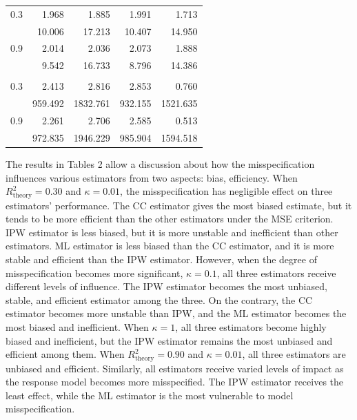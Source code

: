 \documentclass[
  12pt,
]{article}
\begin{document}
\begin{table}[H]
\begin{tabular}[t]{rrrrr}
\hspace{1em}0.3 & 1.968 & 1.885 & 1.991 & 1.713\\
\hspace{1em} & 10.006 & 17.213 & 10.407 & 14.950\\
\hspace{1em}0.9 & 2.014 & 2.036 & 2.073 & 1.888\\
\hspace{1em} & 9.542 & 16.733 & 8.796 & 14.386\\
\addlinespace[0.3em]
\multicolumn{5}{l}{\textbf{Misspecified, $\kappa$ = 1}}\\
\hspace{1em}0.3 & 2.413 & 2.816 & 2.853 & 0.760\\
\hspace{1em} & 959.492 & 1832.761 & 932.155 & 1521.635\\
\hspace{1em}0.9 & 2.261 & 2.706 & 2.585 & 0.513\\
\hspace{1em} & 972.835 & 1946.229 & 985.904 & 1594.518\\
\bottomrule
\end{tabular}
\end{table}

The results in Tables 2 allow a discussion about how the
misspecification influences various estimators from two aspects: bias,
efficiency. When \(R_{\mathrm{theory}}^{2} = 0.30\) and
\(\kappa = 0.01\), the misspecification has negligible effect on three
estimators' performance. The CC estimator gives the most biased
estimate, but it tends to be more efficient than the other estimators
under the MSE criterion. IPW estimator is less biased, but it is more
unstable and inefficient than other estimators. ML estimator is less
biased than the CC estimator, and it is more stable and efficient than
the IPW estimator. However, when the degree of misspecification becomes
more significant, \(\kappa = 0.1\), all three estimators receive
different levels of influence. The IPW estimator becomes the most
unbiased, stable, and efficient estimator among the three. On the
contrary, the CC estimator becomes more unstable than IPW, and the ML
estimator becomes the most biased and inefficient. When \(\kappa = 1\),
all three estimators become highly biased and inefficient, but the IPW
estimator remains the most unbiased and efficient among them. When
\(R_{\mathrm{theory}}^{2} = 0.90\) and \(\kappa = 0.01\), all three
estimators are unbiased and efficient. Similarly, all estimators receive
varied levels of impact as the response model becomes more misspecified.
The IPW estimator receives the least effect, while the ML estimator is
the most vulnerable to model misspecification.
\end{document}

